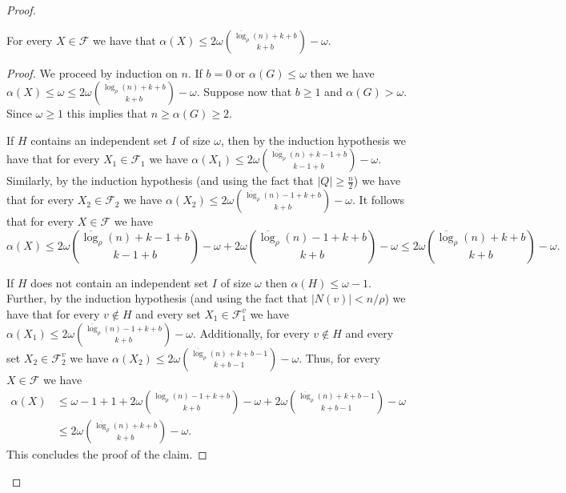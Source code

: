 \documentclass[10pt,a4paper]{amsart}
\newcommand{\cal}{\mathcal}
\begin{document}
\begin{proof}
\begin{claim}\label{clm:alphaBound1}
For every $X \in {\cal F}$ we have that $\alpha(X) \leq 2\omega {\overline{\log}_\rho(n) + k+b \choose k+b} - \omega$.
\end{claim}

\begin{proof}
We proceed by induction on $n$. If $b=0$ or $\alpha(G) \leq \omega$ then we have $\alpha(X) \leq \omega \leq 2\omega {\overline{\log}_\rho(n) + k+b \choose k+b} - \omega$. Suppose now that $b \geq 1$ and $\alpha(G) > \omega$. Since $\omega \geq 1$ this implies that $n \geq \alpha(G) \geq 2$. 

If $H$ contains an independent set $I$ of size $\omega$, then by the induction hypothesis we have that for every $X_1 \in {\cal F}_1$ we have $\alpha(X_1) \leq 2\omega {\overline{\log}_\rho(n) + k-1+b \choose k-1+b} - \omega$.
%
Similarly, by the induction hypothesis (and using the fact that $|Q| \geq \frac{n}{2}$) we have that for every $X_2 \in {\cal F}_2$ we have 
$\alpha(X_2) \leq 2\omega {\overline{\log}_\rho(n)-1 + k+b \choose k+b} - \omega$.
%
It follows that for every $X \in {\cal F}$  we have 
$$\alpha(X) \leq 
2\omega {\overline{\log}_\rho(n) + k-1+b \choose k-1+b} - \omega +
2\omega {\overline{\log}_\rho(n)-1 + k+b \choose k+b} - \omega
\leq
2\omega {\overline{\log}_\rho(n) + k+b \choose k+b} - \omega.
$$

If $H$ does not contain an independent set $I$ of size $\omega$ then $\alpha(H) \leq \omega - 1$. 
%
Further, by the induction hypothesis (and using the fact that $|N(v)| < n/\rho$) we have that for every $v \notin H$ and every set $X_1 \in {\cal F}_1^v$ we have 
$\alpha(X_1) \leq 2\omega {\overline{\log}_\rho(n) - 1 + k+b \choose k+b} - \omega$. Additionally, for every $v \notin H$ and every set $X_2 \in {\cal F}_2^v$ we have $\alpha(X_2) \leq 2\omega {\overline{\log}_\rho(n) + k+b-1 \choose k+b-1} - \omega$. Thus, for every $X \in {\cal F}$  we have 
\begin{align*}
\alpha(X) & \leq \omega - 1 + 1 + 2\omega {\overline{\log}_\rho(n) - 1 + k+b \choose k+b} - \omega + 2\omega {\overline{\log}_\rho(n) + k+b-1 \choose k+b-1} - \omega \\
& \leq 2\omega {\overline{\log}_\rho(n) + k+b \choose k+b} - \omega \mbox{.}
\end{align*}
%
This concludes the proof of the claim.
\end{proof}


\end{proof}
\end{document}
